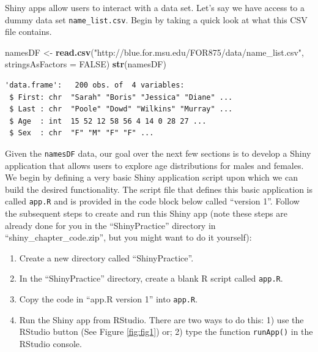 \documentclass[]{krantz}
\makeatletter
\newenvironment{Shaded}{\begin{snugshade}}{\end{snugshade}}
\newcommand{\DataTypeTok}[1]{\textcolor[rgb]{0.27,0.27,0.27}{#1}}
\newcommand{\KeywordTok}[1]{\textcolor[rgb]{0.27,0.27,0.27}{\textbf{#1}}}
\newcommand{\NormalTok}[1]{#1}
\newcommand{\OtherTok}[1]{\textcolor[rgb]{0.37,0.37,0.37}{#1}}
\newcommand{\StringTok}[1]{\textcolor[rgb]{0.5,0.5,0.5}{#1}}
\providecommand{\tightlist}{%
  \setlength{\itemsep}{0pt}\setlength{\parskip}{0pt}}
\newenvironment{kframe}{%
\medskip{}
\setlength{\fboxsep}{.8em}
 \def\at@end@of@kframe{}%
 \ifinner\ifhmode%
  \def\at@end@of@kframe{\end{minipage}}%
  \begin{minipage}{\columnwidth}%
 \fi\fi%
 \def\FrameCommand##1{\hskip\@totalleftmargin \hskip-\fboxsep
 \colorbox{shadecolor}{##1}\hskip-\fboxsep
     \hskip-\linewidth \hskip-\@totalleftmargin \hskip\columnwidth}%
 \MakeFramed {\advance\hsize-\width
   \@totalleftmargin\z@ \linewidth\hsize
   \@setminipage}}%
 {\par\unskip\endMakeFramed%
 \at@end@of@kframe}
\renewenvironment{Shaded}{\begin{kframe}}{\end{kframe}}
\makeatother
\begin{document}
Shiny apps allow users to interact with a data set. Let's say we have access to a dummy data set \texttt{name\_list.csv}. Begin by taking a quick look at what this CSV file contains.

\begin{Shaded}
\begin{Highlighting}[]
\NormalTok{namesDF <-}\StringTok{ }\KeywordTok{read.csv}\NormalTok{(}\StringTok{"http://blue.for.msu.edu/FOR875/data/name_list.csv"}\NormalTok{, }
  \DataTypeTok{stringsAsFactors =} \OtherTok{FALSE}\NormalTok{)}
\KeywordTok{str}\NormalTok{(namesDF)}
\end{Highlighting}
\end{Shaded}

\begin{verbatim}
'data.frame':   200 obs. of  4 variables:
 $ First: chr  "Sarah" "Boris" "Jessica" "Diane" ...
 $ Last : chr  "Poole" "Dowd" "Wilkins" "Murray" ...
 $ Age  : int  15 52 12 58 56 4 14 0 28 27 ...
 $ Sex  : chr  "F" "M" "F" "F" ...
\end{verbatim}

Given the \texttt{namesDF} data, our goal over the next few sections is to develop a Shiny application that allows users to explore age distributions for males and females. We begin by defining a very basic Shiny application script upon which we can build the desired functionality. The script file that defines this basic application is called \texttt{app.R} and is provided in the code block below called ``version 1''. Follow the subsequent steps to create and run this Shiny app (note these steps are already done for you in the ``ShinyPractice'' directory in ``shiny\_chapter\_code.zip'', but you might want to do it yourself):

\begin{enumerate}
\def\labelenumi{\arabic{enumi}.}
\tightlist
\item
  Create a new directory called ``ShinyPractice''.
\item
  In the ``ShinyPractice'' directory, create a blank R script called \texttt{app.R}.
\item
  Copy the code in ``app.R version 1'' into \texttt{app.R}.
\item
  Run the Shiny app from RStudio. There are two ways to do this: 1) use the RStudio button (See Figure \ref{fig:fig1}) or; 2) type the function \texttt{runApp()} in the RStudio console.
\end{enumerate}
\end{document}
